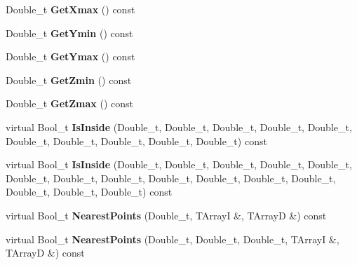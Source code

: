 \begin{DoxyCompactItemize}
\item 
\hypertarget{classTZigZag_a3984a5b137ba805dd84a97be16a2b5ce}{
Double\_\-t {\bfseries GetXmax} () const }
\label{classTZigZag_a3984a5b137ba805dd84a97be16a2b5ce}

\item 
\hypertarget{classTZigZag_a49c16150565cea12ce1ff32ed8f6b16e}{
Double\_\-t {\bfseries GetYmin} () const }
\label{classTZigZag_a49c16150565cea12ce1ff32ed8f6b16e}

\item 
\hypertarget{classTZigZag_a16a040ae25fb344c10eea98ffeece105}{
Double\_\-t {\bfseries GetYmax} () const }
\label{classTZigZag_a16a040ae25fb344c10eea98ffeece105}

\item 
\hypertarget{classTZigZag_a698aee0422db09936cd9248abddf7708}{
Double\_\-t {\bfseries GetZmin} () const }
\label{classTZigZag_a698aee0422db09936cd9248abddf7708}

\item 
\hypertarget{classTZigZag_a1dc64ff0182c707a4189e609caac1826}{
Double\_\-t {\bfseries GetZmax} () const }
\label{classTZigZag_a1dc64ff0182c707a4189e609caac1826}

\item 
\hypertarget{classTZigZag_afef40bf3506d683433f0921fdaad28b7}{
virtual Bool\_\-t {\bfseries IsInside} (Double\_\-t, Double\_\-t, Double\_\-t, Double\_\-t, Double\_\-t, Double\_\-t, Double\_\-t, Double\_\-t, Double\_\-t, Double\_\-t) const }
\label{classTZigZag_afef40bf3506d683433f0921fdaad28b7}

\item 
\hypertarget{classTZigZag_aa5c14c0cb56f63d8fac39ed1b8f65522}{
virtual Bool\_\-t {\bfseries IsInside} (Double\_\-t, Double\_\-t, Double\_\-t, Double\_\-t, Double\_\-t, Double\_\-t, Double\_\-t, Double\_\-t, Double\_\-t, Double\_\-t, Double\_\-t, Double\_\-t, Double\_\-t, Double\_\-t, Double\_\-t) const }
\label{classTZigZag_aa5c14c0cb56f63d8fac39ed1b8f65522}

\item 
\hypertarget{classTZigZag_a49618e36a869bedefc27e6769b4d8629}{
virtual Bool\_\-t {\bfseries NearestPoints} (Double\_\-t, TArrayI \&, TArrayD \&) const }
\label{classTZigZag_a49618e36a869bedefc27e6769b4d8629}

\item 
\hypertarget{classTZigZag_a4ae5ae31190cff08e50edae2418817d8}{
virtual Bool\_\-t {\bfseries NearestPoints} (Double\_\-t, Double\_\-t, Double\_\-t, TArrayI \&, TArrayD \&) const }
\label{classTZigZag_a4ae5ae31190cff08e50edae2418817d8}


\end{DoxyCompactItemize}
